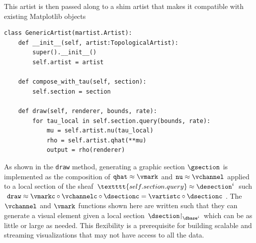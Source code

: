 \documentclass[10pt,journal,compsoc]{IEEEtran}
\renewcommand{\restriction}{\mathord{\upharpoonright}} %
\theoremstyle{definition}
\theoremstyle{remark}
\begin{document}
This artist is then passed along to a shim artist that makes it compatible with existing Matplotlib objects
\begin{verbatim}
class GenericArtist(martist.Artist):
    def __init__(self, artist:TopologicalArtist):
        super().__init__()
        self.artist = artist
        
    def compose_with_tau(self, section):
        self.section = section

    def draw(self, renderer, bounds, rate):
        for tau_local in self.section.query(bounds, rate): 
            mu = self.artist.nu(tau_local)
            rho = self.artist.qhat(**mu)
            output = rho(renderer)
\end{verbatim}
As shown in the \texttt{draw} method, generating a graphic section $\gsection$ is implemented as the composition of $\texttt{qhat} \approx \vmark$ and $\texttt{nu} \approx \vchannel$ applied to a local section of the sheaf $\textttt{self.section.query} \approx \desection^{i}$ such  $\texttt{draw} \approx \vmarkc\circ\vchannelc\circ\dsectionc  = \vartistc\circ \dsectionc$. The $\vchannel$ and $\vmark$ functions shown here are written such that they can generate a visual element given a local section $\dsection\restriction_{\dbase^{i}}$ which can be as little or large as needed. This flexibility is a prerequisite for building scalable and streaming visualizations that may not have access to all the data. 

\begin{figure}[h!]
  \centering
  \label{fig:discussion:bar}
\end{figure}
\end{document}
